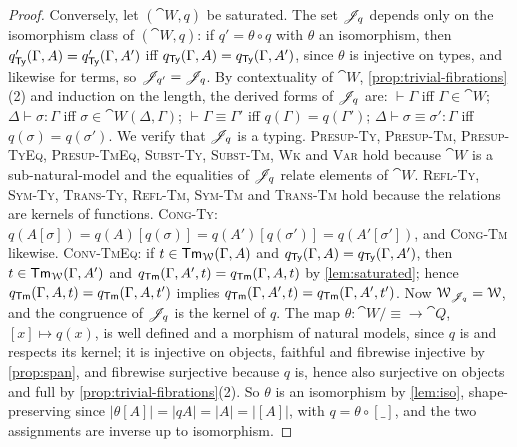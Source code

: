 \begin{proof}
    Conversely, let $(\cat{W}, q)$ be saturated. The set $\mathscr{J}_q$ depends only on the isomorphism class of $(\cat{W}, q)$: if $q' = \theta \circ q$ with $\theta$ an isomorphism, then $q'_{\mathsf{Ty}}(\Gamma, A) = q'_{\mathsf{Ty}}(\Gamma, A')$ iff $q_{\mathsf{Ty}}(\Gamma, A) = q_{\mathsf{Ty}}(\Gamma, A')$, since $\theta$ is injective on types, and likewise for terms, so $\mathscr{J}_{q'} = \mathscr{J}_q$. By contextuality of $\cat{W}$, \cref{prop:trivial-fibrations}(2) and induction on the length, the derived forms of $\mathscr{J}_q$ are: $\vdash \Gamma$ iff $\Gamma \in \cat{W}$; $\Delta \vdash \sigma : \Gamma$ iff $\sigma \in \cat{W}(\Delta, \Gamma)$; $\vdash \Gamma \equiv \Gamma'$ iff $q(\Gamma) = q(\Gamma')$; $\Delta \vdash \sigma \equiv \sigma' : \Gamma$ iff $q(\sigma) = q(\sigma')$. We verify that $\mathscr{J}_q$ is a typing. \textsc{Presup-Ty}, \textsc{Presup-Tm}, \textsc{Presup-TyEq}, \textsc{Presup-TmEq}, \textsc{Subst-Ty}, \textsc{Subst-Tm}, \textsc{Wk} and \textsc{Var} hold because $\cat{W}$ is a sub-natural-model and the equalities of $\mathscr{J}_q$ relate elements of $\cat{W}$. \textsc{Refl-Ty}, \textsc{Sym-Ty}, \textsc{Trans-Ty}, \textsc{Refl-Tm}, \textsc{Sym-Tm} and \textsc{Trans-Tm} hold because the relations are kernels of functions. \textsc{Cong-Ty}: $q(A[\sigma]) = q(A)[q(\sigma)] = q(A')[q(\sigma')] = q(A'[\sigma'])$, and \textsc{Cong-Tm} likewise. \textsc{Conv-TmEq}: if $t \in \mathsf{Tm}_{\mathcal{W}}(\Gamma, A)$ and $q_{\mathsf{Ty}}(\Gamma, A) = q_{\mathsf{Ty}}(\Gamma, A')$, then $t \in \mathsf{Tm}_{\mathcal{W}}(\Gamma, A')$ and $q_{\mathsf{Tm}}(\Gamma, A', t) = q_{\mathsf{Tm}}(\Gamma, A, t)$ by \cref{lem:saturated}; hence $q_{\mathsf{Tm}}(\Gamma, A, t) = q_{\mathsf{Tm}}(\Gamma, A, t')$ implies $q_{\mathsf{Tm}}(\Gamma, A', t) = q_{\mathsf{Tm}}(\Gamma, A', t')$. Now $\mathcal{W}_{\mathscr{J}_q} = \mathcal{W}$, and the congruence of $\mathscr{J}_q$ is the kernel of $q$. The map $\theta : \cat{W}/{\equiv} \to \cat{Q}$, $[x] \mapsto q(x)$, is well defined and a morphism of natural models, since $q$ is and respects its kernel; it is injective on objects, faithful and fibrewise injective by \cref{prop:span}, and fibrewise surjective because $q$ is, hence also surjective on objects and full by \cref{prop:trivial-fibrations}(2). So $\theta$ is an isomorphism by \cref{lem:iso}, shape-preserving since $|\theta[A]| = |qA| = |A| = |[A]|$, with $q = \theta \circ [\_]$, and the two assignments are inverse up to isomorphism.
\end{proof}

